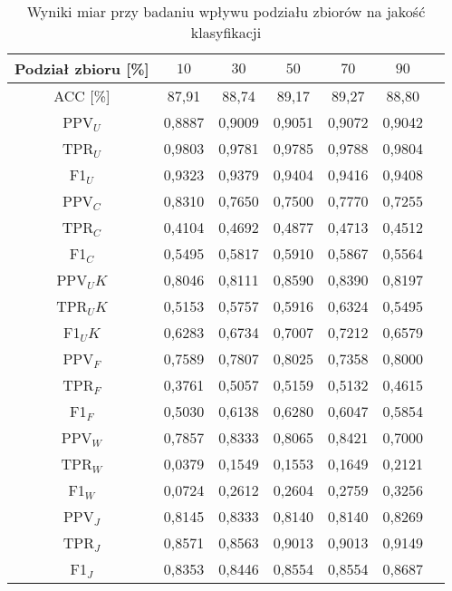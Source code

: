 \documentclass{article}
\begin{document}
\begin{table}[h!]
    \centering
    \begin{tabular}{|c|c|c|c|c|c|c}
    \hline
    \textbf{Podział zbioru [\%]} & \textbf{\(10\)} & \textbf{\(30\)} & \textbf{\(50\)} & \textbf{\(70\)}  & \textbf{\(90\)} \\ \hline
    ACC [\%] & 87,91 & 88,74 & 89,17 & 89,27 & 88,80\\ \hline
    PPV\(_U\) & 0,8887 & 0,9009 & 0,9051 & 0,9072 & 0,9042\\ \hline
    TPR\(_U\) & 0,9803 & 0,9781 & 0,9785 & 0,9788 & 0,9804\\ \hline
    F1\(_U\) & 0,9323 & 0,9379 & 0,9404 & 0,9416 & 0,9408\\ \hline
    PPV\(_C\) & 0,8310 & 0,7650 & 0,7500 & 0,7770 & 0,7255\\ \hline
    TPR\(_C\) & 0,4104 & 0,4692 & 0,4877 & 0,4713 & 0,4512\\ \hline
    F1\(_C\) & 0,5495 & 0,5817 & 0,5910 & 0,5867 & 0,5564\\ \hline
    PPV\(_UK\) & 0,8046 & 0,8111 & 0,8590& 0,8390 & 0,8197\\ \hline
    TPR\(_UK\) & 0,5153 & 0,5757 & 0,5916 & 0,6324 & 0,5495\\ \hline
    F1\(_UK\) & 0,6283 & 0,6734 & 0,7007 & 0,7212 & 0,6579\\ \hline
    PPV\(_F\) & 0,7589 & 0,7807 & 0,8025 & 0,7358 & 0,8000\\ \hline
    TPR\(_F\) & 0,3761 & 0,5057 & 0,5159 & 0,5132 & 0,4615\\ \hline
    F1\(_F\) & 0,5030 & 0,6138 & 0,6280 & 0,6047 & 0,5854\\ \hline
    PPV\(_W\) & 0,7857 & 0,8333 & 0,8065 & 0,8421 & 0,7000\\ \hline
    TPR\(_W\) & 0,0379 & 0,1549 & 0,1553 & 0,1649 & 0,2121\\ \hline
    F1\(_W\) & 0,0724 & 0,2612 & 0,2604 & 0,2759 & 0,3256\\ \hline
    PPV\(_J\) & 0,8145 & 0,8333 & 0,8140 & 0,8140 & 0,8269\\ \hline
    TPR\(_J\) & 0,8571 & 0,8563 & 0,9013 & 0,9013 & 0,9149\\ \hline
    F1\(_J\) & 0,8353 & 0,8446 & 0,8554 & 0,8554 & 0,8687\\ \hline
    \end{tabular}
    \caption{Wyniki miar przy badaniu wpływu podziału zbiorów na jakość klasyfikacji}
\end{table}
\end{document}
